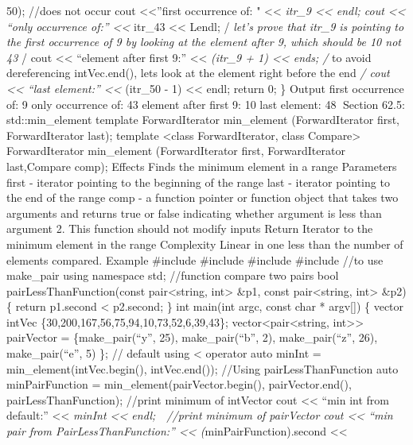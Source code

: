 50); //does not occur cout \textless\textless{}''first occurrence of: "
\textless\textless{} \emph{itr\_9 \textless\textless{} endl; cout
\textless\textless{} ``only occurrence of:'' \textless\textless{}
}itr\_43 \textless\textless{} Lendl; /\emph{ let's prove that itr\_9 is
pointing to the first occurrence of 9 by looking at the element after 9,
which should be 10 not 43 }/ cout \textless\textless{} ``element after
first 9:'' \textless\textless{} \emph{(itr\_9 + 1) \textless\textless{}
ends; /} to avoid dereferencing intVec.end(), lets look at the element
right before the end \emph{/ cout \textless\textless{} ``last element:''
\textless\textless{} }(itr\_50 - 1) \textless\textless{} endl; return 0;
\} Output first occurrence of: 9 only occurrence of: 43 element after
first 9: 10 last element: 48 Section 62.5: std::min\_element template
ForwardIterator min\_element (ForwardIterator first, ForwardIterator
last); template \textless class ForwardIterator, class
Compare\textgreater{} ForwardIterator min\_element (ForwardIterator
first, ForwardIterator last,Compare comp); Eﬀects Finds the minimum
element in a range Parameters first - iterator pointing to the beginning
of the range last - iterator pointing to the end of the range comp - a
function pointer or function object that takes two arguments and returns
true or false indicating whether argument is less than argument 2. This
function should not modify inputs Return Iterator to the minimum element
in the range Complexity Linear in one less than the number of elements
compared. Example \#include \#include \#include \#include //to use
make\_pair using namespace std; //function compare two pairs bool
pairLessThanFunction(const pair\textless string, int\textgreater{} \&p1,
const pair\textless string, int\textgreater{} \&p2) \{ return p1.second
\textless{} p2.second; \} int main(int argc, const char * argv{[}{]}) \{
vector intVec \{30,200,167,56,75,94,10,73,52,6,39,43\};
vector\textless pair\textless string, int\textgreater\textgreater{}
pairVector = \{make\_pair(``y'', 25), make\_pair(``b'', 2),
make\_pair(``z'', 26), make\_pair(``e'', 5) \}; // default using
\textless{} operator auto minInt = min\_element(intVec.begin(),
intVec.end()); //Using pairLessThanFunction auto minPairFunction =
min\_element(pairVector.begin(), pairVector.end(),
pairLessThanFunction); //print minimum of intVector cout
\textless\textless{} ``min int from default:'' \textless\textless{}
\emph{minInt \textless\textless{} endl;  //print minimum of pairVector
cout \textless\textless{} ``min pair from PairLessThanFunction:''
\textless\textless{} (}minPairFunction).second \textless\textless{}
